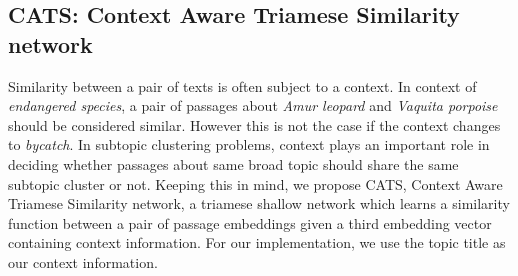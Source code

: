 \subsection{CATS: Context Aware Triamese Similarity network}\label{sec:cats} Similarity between a pair of texts is often subject to a context. In context of \textit{endangered species}, a pair of passages about \textit{Amur leopard} and \textit{Vaquita porpoise} should be considered similar. However this is not the case if the context changes to \textit{bycatch}. In subtopic clustering problems, context plays an important role in deciding whether passages about same broad topic should share the same subtopic cluster or not. Keeping this in mind, we propose CATS, Context Aware Triamese Similarity network, a triamese shallow network which learns a similarity function between a pair of passage embeddings given a third embedding vector containing context information. For our implementation, we use the topic title as our context information.

